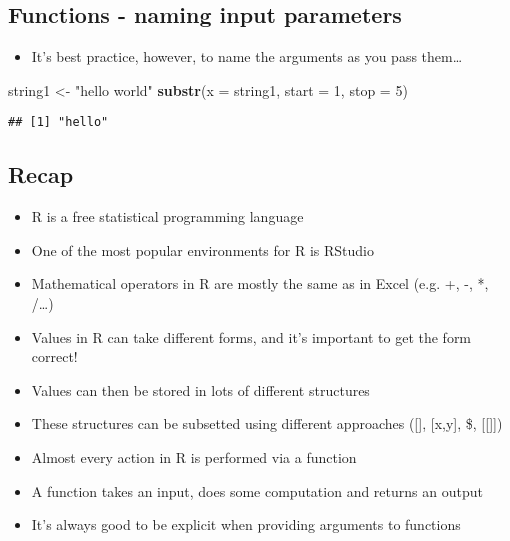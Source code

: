 \documentclass[]{article}
\newenvironment{Shaded}{\begin{snugshade}}{\end{snugshade}}
\newcommand{\KeywordTok}[1]{\textcolor[rgb]{0.13,0.29,0.53}{\textbf{#1}}}
\newcommand{\DataTypeTok}[1]{\textcolor[rgb]{0.13,0.29,0.53}{#1}}
\newcommand{\DecValTok}[1]{\textcolor[rgb]{0.00,0.00,0.81}{#1}}
\newcommand{\StringTok}[1]{\textcolor[rgb]{0.31,0.60,0.02}{#1}}
\newcommand{\NormalTok}[1]{#1}
\providecommand{\tightlist}{%
  \setlength{\itemsep}{0pt}\setlength{\parskip}{0pt}}
\begin{document}
\subsection{Functions - naming input
parameters}\label{functions---naming-input-parameters-2}

\begin{itemize}
\tightlist
\item
  It's best practice, however, to name the arguments as you pass
  them\ldots{}
\end{itemize}

\begin{Shaded}
\begin{Highlighting}[]
\NormalTok{string1 <-}\StringTok{ "hello world"}
\KeywordTok{substr}\NormalTok{(}\DataTypeTok{x =}\NormalTok{ string1, }\DataTypeTok{start =} \DecValTok{1}\NormalTok{, }\DataTypeTok{stop =} \DecValTok{5}\NormalTok{)}
\end{Highlighting}
\end{Shaded}

\begin{verbatim}
## [1] "hello"
\end{verbatim}

\subsection{Recap}\label{recap}

\begin{itemize}
\tightlist
\item
  R is a free statistical programming language
\item
  One of the most popular environments for R is RStudio
\item
  Mathematical operators in R are mostly the same as in Excel (e.g. +,
  -, *, /\ldots{})
\item
  Values in R can take different forms, and it's important to get the
  form correct!
\item
  Values can then be stored in lots of different structures
\item
  These structures can be subsetted using different approaches ({[}{]},
  {[}x,y{]}, \$, {[}{[}{]}{]})
\item
  Almost every action in R is performed via a function
\item
  A function takes an input, does some computation and returns an output
\item
  It's always good to be explicit when providing arguments to functions
\end{itemize}
\end{document}

